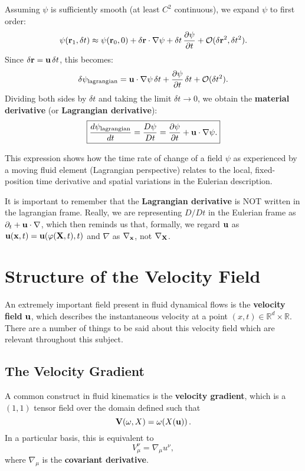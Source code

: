 Assuming $\psi$ is sufficiently smooth (at least $C^2$ continuous), we expand $\psi$ to first order:
\[
\psi({\bf r}_1, \delta t) \approx \psi({\bf r}_0, 0) + \delta {\bf r} \cdot \nabla \psi + \delta t \, \frac{\partial \psi}{\partial t} + \mathcal{O}(\delta {\bf r}^2, \delta t^2).
\]
Since $\delta {\bf r} = {\bf u} \, \delta t$, this becomes:
\[
\delta \psi_{\rm lagrangian} = {\bf u} \cdot \nabla \psi \, \delta t + \frac{\partial \psi}{\partial t} \, \delta t + \mathcal{O}(\delta t^2).
\]
Dividing both sides by $\delta t$ and taking the limit $\delta t \to 0$, we obtain the \textbf{material derivative} (or \textbf{Lagrangian derivative}):
\begin{equation}
    \label{eq:euler-lagrange-convert}
    \boxed{
    \frac{d \psi_{\rm lagrangian}}{dt} = \frac{D \psi}{D t} = \frac{\partial \psi}{\partial t} + {\bf u} \cdot \nabla \psi.}
\end{equation}

This expression shows how the time rate of change of a field $\psi$ as experienced by a moving fluid element (Lagrangian perspective) relates to the local, fixed-position time derivative and spatial variations in the Eulerian description.
\begin{remark}
    It is important to remember that the \textbf{Lagrangian derivative} is NOT written in the lagrangian frame. Really, we are representing $D/Dt$ in the Eulerian frame as $\partial_t + {\bf u} \cdot \nabla$,  which then reminds us that, formally, we regard ${\bf u}$ as ${\bf u}({\bf x},t) = {\bf u}(\varphi({\bf X},t),t)$ and $\nabla$ as $\nabla_{\bf x}$, not $\nabla_{\bf X}$.
\end{remark}

\section{Structure of the Velocity Field}

An extremely important field present in fluid dynamical flows is the \textbf{velocity field} ${\bf u}$, which describes the instantaneous velocity at a point $(x,t) \in \mathbb{R}^d \times \mathbb{R}$. There are a number of things to be said about this velocity field which are relevant throughout this subject.

\subsection{The Velocity Gradient}

A common construct in fluid kinematics is the \textbf{velocity gradient}, which is a $(1,1)$ tensor field over the domain defined such that
\[
{\bf V}(\omega, X) = \omega\!\left(X({\bf u})\right).
\]
In a particular basis, this is equivalent to
\[
V_\mu^\nu = \nabla_\mu u^\nu,
\]
where $\nabla_\mu$ is the \textbf{covariant derivative}. 

